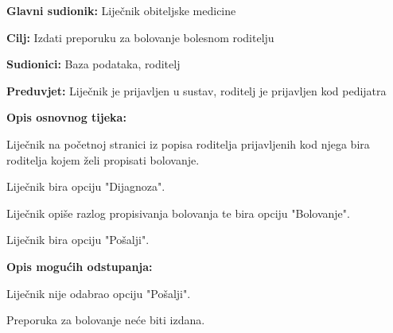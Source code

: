 					
					\noindent {}
					\begin{packed_item}
						
						\item \textbf{Glavni sudionik: }Liječnik obiteljske medicine
						\item  \textbf{Cilj:} Izdati preporuku za bolovanje bolesnom roditelju
						\item  \textbf{Sudionici:} Baza podataka, roditelj
						\item  \textbf{Preduvjet:} Liječnik je prijavljen u sustav, roditelj je prijavljen kod pedijatra
						\item  \textbf{Opis osnovnog tijeka:}
						
						\item[] \begin{packed_enum}
							
							\item Liječnik na početnoj stranici iz popisa roditelja prijavljenih kod njega bira roditelja kojem želi propisati bolovanje.
							\item Liječnik bira opciju "Dijagnoza".
							\item Liječnik opiše razlog propisivanja bolovanja te bira opciju "Bolovanje".
							\item Liječnik bira opciju "Pošalji".
						\end{packed_enum}
						
						\item  \textbf{Opis mogućih odstupanja:}
						
						\item[] \begin{packed_item}
							
							\item[4.a] Liječnik nije odabrao opciju "Pošalji".
							\item[] \begin{packed_enum}
								
								\item Preporuka za bolovanje neće biti izdana.
							\end{packed_enum}
							
							
						\end{packed_item}
						
						
					\end{packed_item}
					
